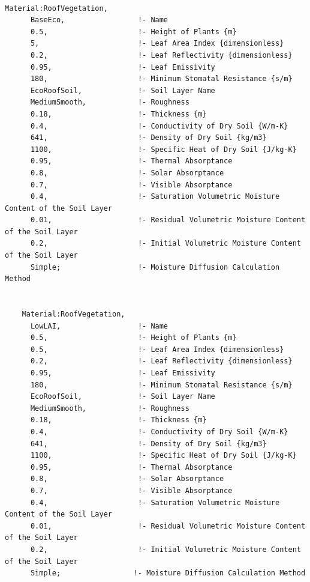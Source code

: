 \begin{lstlisting}

Material:RoofVegetation,
      BaseEco,                 !- Name
      0.5,                     !- Height of Plants {m}
      5,                       !- Leaf Area Index {dimensionless}
      0.2,                     !- Leaf Reflectivity {dimensionless}
      0.95,                    !- Leaf Emissivity
      180,                     !- Minimum Stomatal Resistance {s/m}
      EcoRoofSoil,             !- Soil Layer Name
      MediumSmooth,            !- Roughness
      0.18,                    !- Thickness {m}
      0.4,                     !- Conductivity of Dry Soil {W/m-K}
      641,                     !- Density of Dry Soil {kg/m3}
      1100,                    !- Specific Heat of Dry Soil {J/kg-K}
      0.95,                    !- Thermal Absorptance
      0.8,                     !- Solar Absorptance
      0.7,                     !- Visible Absorptance
      0.4,                     !- Saturation Volumetric Moisture Content of the Soil Layer
      0.01,                    !- Residual Volumetric Moisture Content of the Soil Layer
      0.2,                     !- Initial Volumetric Moisture Content of the Soil Layer
      Simple;                  !- Moisture Diffusion Calculation Method


    Material:RoofVegetation,
      LowLAI,                  !- Name
      0.5,                     !- Height of Plants {m}
      0.5,                     !- Leaf Area Index {dimensionless}
      0.2,                     !- Leaf Reflectivity {dimensionless}
      0.95,                    !- Leaf Emissivity
      180,                     !- Minimum Stomatal Resistance {s/m}
      EcoRoofSoil,             !- Soil Layer Name
      MediumSmooth,            !- Roughness
      0.18,                    !- Thickness {m}
      0.4,                     !- Conductivity of Dry Soil {W/m-K}
      641,                     !- Density of Dry Soil {kg/m3}
      1100,                    !- Specific Heat of Dry Soil {J/kg-K}
      0.95,                    !- Thermal Absorptance
      0.8,                     !- Solar Absorptance
      0.7,                     !- Visible Absorptance
      0.4,                     !- Saturation Volumetric Moisture Content of the Soil Layer
      0.01,                    !- Residual Volumetric Moisture Content of the Soil Layer
      0.2,                     !- Initial Volumetric Moisture Content of the Soil Layer
      Simple;                 !- Moisture Diffusion Calculation Method
\end{lstlisting}

